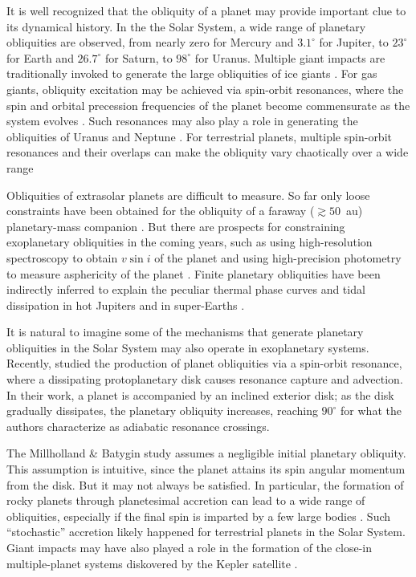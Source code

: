 It is well recognized that the obliquity of a planet may provide important clue
to its dynamical history. In the the Solar System, a wide range of planetary
obliquities are observed, from nearly zero for Mercury and $3.1^\circ$ for
Jupiter, to $23^\circ$ for Earth and $26.7^\circ$ for Saturn, to $98^\circ$ for
Uranus. Multiple giant impacts are traditionally invoked to generate the large
obliquities of ice giants \citep{original_gi, benz1989tilting,
korycansky1990one, morbidelli_gi}. For gas giants, obliquity excitation may be
achieved via spin-orbit resonances, where the spin and orbital precession
frequencies of the planet become commensurate as the system evolves
\citep{ward2004I, ward2004II, vokrouhlicky2015tilting}. Such resonances may also
play a role in generating the obliquities of Uranus and Neptune
\citep{hamilton_tilting_ice}. For terrestrial planets, multiple spin-orbit
resonances and their overlaps can make the obliquity vary chaotically over a
wide range \citep[e.g.][]{laskar1993chaotic, touma1993chaotic, correia2003long}

Obliquities of extrasolar planets are difficult to measure. So far only loose
constraints have been obtained for the obliquity of a faraway ($\gtrsim 50$~au)
planetary-mass companion \citep{bryan2020obliquity}. But there are prospects for
constraining exoplanetary obliquities in the coming years, such as using
high-resolution spectroscopy to obtain $v\sin i$ of the planet
\citep{snellen2014fast, bryan2018constraints} and using high-precision
photometry to measure asphericity of the planet \citep{seager2002constraining}.
Finite planetary obliquities have been indirectly inferred to explain the
peculiar thermal phase curves \citep[see e.g.][]{millholland_signatures,
ohno_infer_obl} and tidal dissipation in hot Jupiters
\citep{millholland_wasp12b} and in super-Earths
\citep{millholland2019obliquity}.

It is natural to imagine some of the mechanisms that generate planetary
obliquities in the Solar System may also operate in exoplanetary systems.
Recently, \citet{millholland_disk} studied the production of planet obliquities
via a spin-orbit resonance, where a dissipating protoplanetary disk causes
resonance capture and advection. In their work, a planet is accompanied by an
inclined exterior disk; as the disk gradually dissipates, the planetary
obliquity increases, reaching $90^\circ$ for what the authors characterize as
adiabatic resonance crossings.

The Millholland \& Batygin study assumes a negligible initial planetary
obliquity. This assumption is intuitive, since the planet attains its spin
angular momentum from the disk. But it may not always be satisfied. In
particular, the formation of rocky planets through planetesimal accretion can
lead to a wide range of obliquities, especially if the final spin is imparted by
a few large bodies \citep{dones1993does, lissauer1997accretion,
miguel2010planet}. Such ``stochastic'' accretion likely happened for terrestrial
planets in the Solar System. Giant impacts may have also played a role in the
formation of the close-in multiple-planet systems diskovered by the Kepler
satellite \citep[e.g.][]{inamdar2015formation, izidoro2017breaking}.

